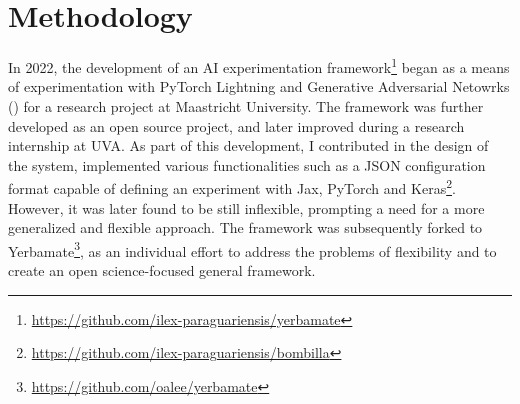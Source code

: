 


\section{Methodology}


In 2022, the development of an AI experimentation framework\footnote{\url{https://github.com/ilex-paraguariensis/yerbamate}} began as a means of experimentation with PyTorch Lightning and Generative Adversarial Netowrks (\cite{goodfellow2020generative}) for a research project at Maastricht University. The framework was further developed as an open source project, and later improved during a research internship at UVA. As part of this development, I contributed in the design of the system, implemented various functionalities such as a JSON configuration format capable of defining an experiment with Jax, PyTorch and Keras\footnote{\url{https://github.com/ilex-paraguariensis/bombilla}}. However, it was later found to be still inflexible, prompting a need for a more generalized and flexible approach. The framework was subsequently forked to Yerbamate\footnote{\url{https://github.com/oalee/yerbamate}}, as an individual effort to address the problems of flexibility and to create an open science-focused general framework.





